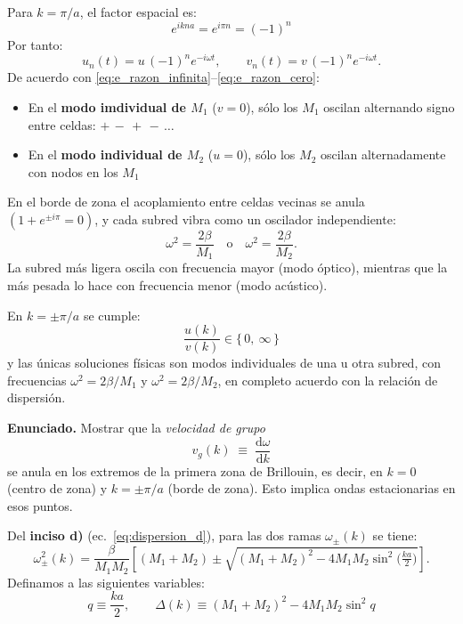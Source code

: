 \documentclass{article}
\begin{document}
Para \(k=\pi/a\), el factor espacial es:
\[
e^{ikna}=e^{i\pi n}=(-1)^{n}
\]
Por tanto:
\begin{equation}
u_{n}(t)=u\,(-1)^{n}e^{-i\omega t},\qquad
v_{n}(t)=v\,(-1)^{n}e^{-i\omega t}.
\label{eq:e_patron_espacial}
\end{equation}
De acuerdo con \eqref{eq:e_razon_infinita}–\eqref{eq:e_razon_cero}:
\begin{itemize}
  \item[$\bullet$] En el \textbf{modo imdividual de \(M_{1}\)} (\(v=0\)), sólo los \(M_{1}\) oscilan alternando signo entre celdas: \(+\,-\,+\,-\,\dots\)
  \item[$\bullet$] En el \textbf{modo individual de \(M_{2}\)} (\(u=0\)), sólo los \(M_{2}\) oscilan alternadamente con nodos en los \(M_{1}\)
\end{itemize}

En el borde de zona el acoplamiento entre celdas vecinas se anula \((1+e^{\pm i\pi}=0)\),
y cada subred vibra como un oscilador independiente:
\[
\omega^{2}=\frac{2\beta}{M_{1}} \quad\text{o}\quad \omega^{2}=\frac{2\beta}{M_{2}}.
\]
La subred más ligera oscila con frecuencia mayor (modo óptico),  
mientras que la más pesada lo hace con frecuencia menor (modo acústico).

En \(k=\pm\pi/a\) se cumple:
\[
\boxed{\;\dfrac{u(k)}{v(k)}\in\{\,0,\ \infty\,\}\;}
\]
y las únicas soluciones físicas son modos individuales de una u otra subred, con frecuencias
\(\omega^{2}=2\beta/M_{1}\) y \(\omega^{2}=2\beta/M_{2}\), en completo acuerdo con la relación de dispersión.


\;

\textcolor{trueblue}{\textbf{Enunciado.}} Mostrar que la \emph{velocidad de grupo}
\[
v_g(k)\;\equiv\;\frac{\mathrm d\omega}{\mathrm dk}
\]
se anula en los extremos de la primera zona de Brillouin, es decir, en
\(k=0\) (centro de zona) y \(k=\pm\pi/a\) (borde de zona). Esto implica
ondas estacionarias en esos puntos.

\vspace{0.4cm}
Del \textbf{inciso d)} (ec.~\eqref{eq:dispersion_d}), para las dos ramas \(\omega_\pm(k)\) se tiene:
\begin{equation}
\omega^{2}_{\pm}(k)
= \frac{\beta}{M_{1}M_{2}}\left[(M_{1}+M_{2})
\pm \sqrt{(M_{1}+M_{2})^{2}-4M_{1}M_{2}\sin^{2}\!\Big(\tfrac{ka}{2}\Big)}\right].
\label{eq:f_dispersion}
\end{equation}
Definamos a las siguientes variables:
\[q\equiv \frac{ka}{2},\qquad
\Delta(k)\equiv (M_{1}+M_{2})^{2}-4M_{1}M_{2}\sin^{2}q
\]
\end{document}
